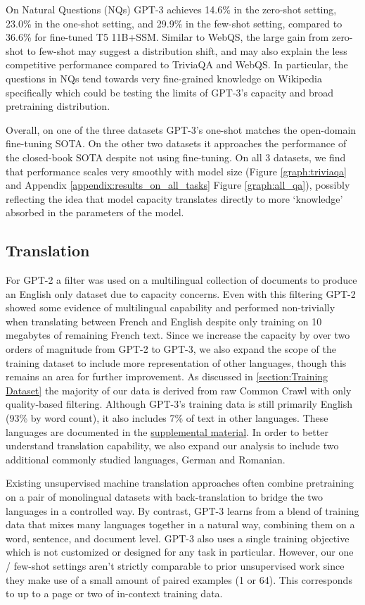 \documentclass{article}
\begin{document}
On Natural Questions (NQs) GPT-3 achieves 14.6\% in the zero-shot setting, 23.0\% in the one-shot setting, and 29.9\% in the few-shot setting, compared to 36.6\% for fine-tuned T5 11B+SSM.  Similar to WebQS, the large gain from zero-shot to few-shot may suggest a distribution shift, and may also explain the less competitive performance compared to TriviaQA and WebQS.  In particular, the questions in NQs tend towards very fine-grained knowledge on Wikipedia specifically which could be testing the limits of GPT-3's capacity and broad pretraining distribution.

Overall, on one of the three datasets GPT-3's one-shot matches the open-domain fine-tuning SOTA. On the other two datasets it approaches the performance of the closed-book SOTA despite not using fine-tuning.  On all 3 datasets, we find that performance scales very smoothly with model size (Figure \ref{graph:triviaqa} and Appendix \ref{appendix:results_on_all_tasks} Figure \ref{graph:all_qa}), possibly reflecting the idea that model capacity translates directly to more ‘knowledge’ absorbed in the parameters of the model.

    \subsection{Translation}
    \label{section:Translation}

For GPT-2 a filter was used on a multilingual collection of documents to produce an English only dataset due to capacity concerns. Even with this filtering GPT-2 showed some evidence of multilingual capability and performed non-trivially when translating between French and English despite only training on 10 megabytes of remaining French text. Since we increase the capacity by over two orders of magnitude from GPT-2 to GPT-3, we also expand the scope of the training dataset to include more representation of other languages, though this remains an area for further improvement. As discussed in \ref{section:Training Dataset} the majority of our data is derived from raw Common Crawl with only quality-based filtering. Although GPT-3's training data is still primarily English (93\% by word count), it also includes 7\% of text in other languages. These languages are documented in the \href{https://github.com/openai/gpt-3}{supplemental material}. In order to better understand translation capability, we also expand our analysis to include two additional commonly studied languages, German and Romanian.

Existing unsupervised machine translation approaches often combine pretraining on a pair of monolingual datasets with back-translation \cite{sennrich2015improving} to bridge the two languages in a controlled way. By contrast, GPT-3 learns from a blend of training data that mixes many languages together in a natural way, combining them on a word, sentence, and document level. GPT-3 also uses a single training objective which is not customized or designed for any task in particular. However, our one / few-shot settings aren't strictly comparable to prior unsupervised work since they make use of a small amount of paired examples (1 or 64). This corresponds to up to a page or two of in-context training data. 
\end{document}

